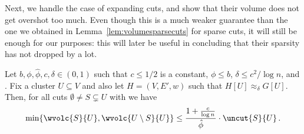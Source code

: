 \noindent
Next, we handle the case of expanding cuts, and show that their volume does not get overshot too much. Even though this is a much weaker guarantee than the one we obtained in Lemma~\ref{lem:volumesparsecuts} for sparse cuts, it will  still be enough for our purposes: this will later be useful in concluding that their sparsity has not dropped by a lot.

\begin{lemma}
	\label{lem:testexpandingcuts}
	Let $b, \phi,\hat{\phi}, c,\delta \in (0,1)$ such that $c \leq 1/2$ is a constant, $\phi \le b$, $\delta \le c^2 / \log n$, and . Fix a cluster $U \subseteq V$ and also let $H=(V,E',w)$ such that $H[U] \approx_\delta G[U]$. Then, for all cuts $\emptyset \neq S \subsetneq U$ with  we have
	\begin{equation*}
		\min \{\wvolc{S}{U},\wvolc{U \setminus S}{U}\} \le \frac{1+\frac{c}{\log n}}{\hat{\phi}} \cdot \uncut{S}{U}\, .
	\end{equation*}
\end{lemma}
